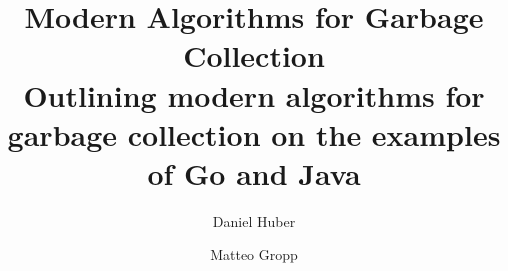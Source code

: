 

\title{Modern Algorithms for Garbage Collection \\ \small{Outlining modern algorithms for garbage collection on the examples of Go and Java}}
\author{Daniel Huber \and Matteo Gropp}


    \maketitle
    \tableofcontents

    
    
    
    
    
    

    \printbibliography

